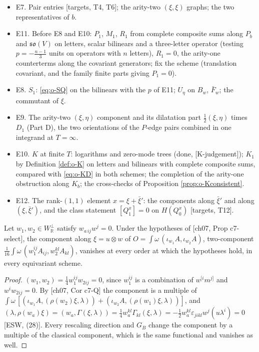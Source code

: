 \begin{itemize}
\item E7. Pair entries [targets, T4, T6]; the arity-two $(\xi,\xi)$ graphs; the two representatives of $b$.
\item E11. Before E8 and E10: $P_1$, $M_1$, $R_1$ from complete composite sums along $P_b$ and $\mathfrak{so}(V)$ on letters, scalar bilinears and a three-letter operator (testing $p=-\tfrac{n-1}3$ units on operators with $n$ letters), $R_1=0$, the arity-one counterterms along the covariant generators; fix the scheme (translation covariant, and the family finite parts giving $P_1=0$).
\item E8. $S_1$: \eqref{eq:o-SQ} on the bilinears with the $p$ of E11; $U_\eta$ on $B_w$, $\bar F_w$; the commutant of $\xi$.
\item E9. The arity-two $(\xi,\eta)$ component and its dilatation part $\tfrac12(\xi,\eta)$ times $D_1$ (Part D), the two orientations of the $P$-edge pairs combined in one integrand at $T=\infty$.
\item E10. $K$ at finite $T$: logarithms and zero-mode trees (done, [K-judgement]); $K_1$ by Definition \ref{def:o-K} on letters and bilinears with complete composite sums, compared with \eqref{eq:o-KD} in both schemes; the completion of the arity-one obstruction along $K_b$; the cross-checks of Proposition \ref{prop:o-Kconsistent}.
\item E12. The rank-$(1,1)$ element $x=\xi+\bar\xi'$: the components along $\bar\xi'$ and along $(\xi,\bar\xi')$, and the class statement $[Q^x_1]=0$ on $H(Q^x_0)$ [targets, T12].
\end{itemize}

\begin{proposition}
\label{prop:o-planevanish}
Let $w_1,w_2\in W_{\mathbb R}^\perp$ satisfy $w_{a\,ij}w^j=0$. Under the hypotheses of [ch07, Prop c7-select], the component along $\xi=u\otimes w$ of $O=\int\omega\,(\iota_{w_1}A,\iota_{w_2}A)$, two-component $\tfrac1{16}\int\omega\,(w_1^{ij}A_{ij},w_2^{kl}A_{kl})$, vanishes at every order at which the hypotheses hold, in every equivariant scheme.
\end{proposition}

\begin{proof}
$(w_1,w_2)=\tfrac14w_1^{ij}w_{2ij}=0$, since $w_1^{ij}$ is a combination of $w^{[i}m^{j]}$ and $w^iw_{2ij}=0$. By [ch07, Cor c7-Q] the component is a multiple of $\int\omega\,[(\iota_{w_1}A,(\rho(w_2)\xi,\lambda))+(\iota_{w_2}A,(\rho(w_1)\xi,\lambda))]$, and $(\lambda,\rho(w_a)\xi)=(w_a,\Gamma(\xi,\lambda))=\tfrac14w_a^{kl}\Gamma_{kl}(\xi,\lambda)=-\tfrac12w_a^{kl}\varepsilon_{jikl}w^j(u\lambda^i)=0$ [ESW, (28)]. Every rescaling direction and $G_B$ change the component by a multiple of the classical component, which is the same functional and vanishes as well.
\end{proof}
